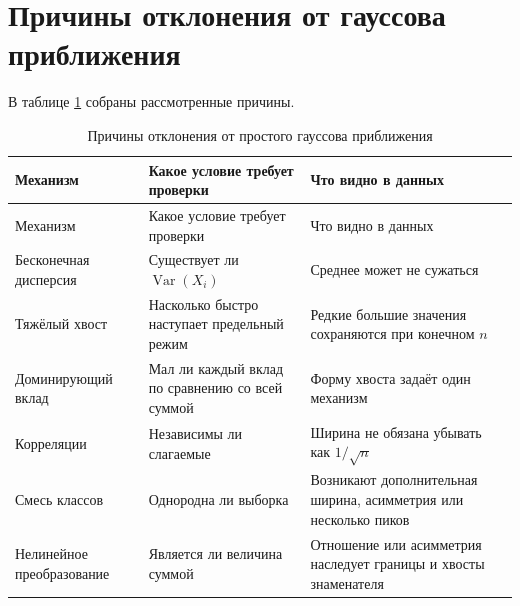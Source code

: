 \documentclass[
  russian,
  11pt,
  a4paper,
  open=any]{scrbook}
\begin{document}
\section{Причины отклонения от гауссова
приближения}\label{ux43fux440ux438ux447ux438ux43dux44b-ux43eux442ux43aux43bux43eux43dux435ux43dux438ux44f-ux43eux442-ux433ux430ux443ux441ux441ux43eux432ux430-ux43fux440ux438ux431ux43bux438ux436ux435ux43dux438ux44f}

В таблице \ref{tbl-ch5-nongaussian-mechanisms} собраны рассмотренные
причины.

\begin{longtable}[]{@{}
  >{\raggedright\arraybackslash}p{}
  >{\raggedright\arraybackslash}p{}
  >{\raggedright\arraybackslash}p{}@{}}
\caption{Причины отклонения от простого гауссова
приближения}\label{tbl-ch5-nongaussian-mechanisms}\tabularnewline
\toprule\noalign{}
\begin{minipage}[b]{\linewidth}\raggedright
Механизм
\end{minipage} & \begin{minipage}[b]{\linewidth}\raggedright
Какое условие требует проверки
\end{minipage} & \begin{minipage}[b]{\linewidth}\raggedright
Что видно в данных
\end{minipage} \\
\midrule\noalign{}
\endfirsthead
\toprule\noalign{}
\begin{minipage}[b]{\linewidth}\raggedright
Механизм
\end{minipage} & \begin{minipage}[b]{\linewidth}\raggedright
Какое условие требует проверки
\end{minipage} & \begin{minipage}[b]{\linewidth}\raggedright
Что видно в данных
\end{minipage} \\
\midrule\noalign{}
\endhead
\bottomrule\noalign{}
\endlastfoot
Бесконечная дисперсия & Существует ли \(\operatorname{Var}(X_i)\) &
Среднее может не сужаться \\
Тяжёлый хвост & Насколько быстро наступает предельный режим & Редкие
большие значения сохраняются при конечном \(n\) \\
Доминирующий вклад & Мал ли каждый вклад по сравнению со всей суммой &
Форму хвоста задаёт один механизм \\
Корреляции & Независимы ли слагаемые & Ширина не обязана убывать как
\(1/\sqrt n\) \\
Смесь классов & Однородна ли выборка & Возникают дополнительная ширина,
асимметрия или несколько пиков \\
Нелинейное преобразование & Является ли величина суммой & Отношение или
асимметрия наследует границы и хвосты знаменателя \\
\end{longtable}
\end{document}
